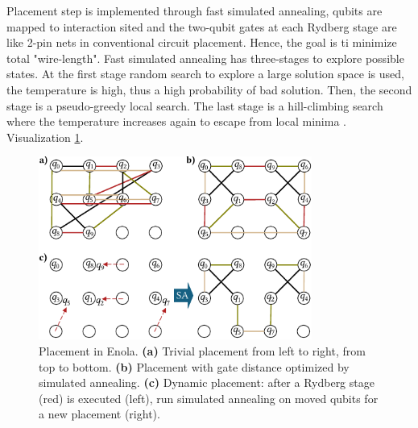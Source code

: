 Placement step is implemented through fast simulated annealing, 
qubits are mapped to interaction sited and the two-qubit
gates at each Rydberg stage are like 2-pin nets in conventional
circuit placement. Hence, the goal is ti minimize total "wire-length".
Fast simulated annealing has three-stages to explore possible states.
At the first stage random search to explore a large solution space is used, the temperature is high, 
thus a high probability of bad solution.
Then, the second stage is a pseudo-greedy local search. 
The last stage is a hill-climbing search where
the temperature increases again to escape from local minima \parencite{Tan_2025_Enola}. 
Visualization \ref{fig:placement_Enola}.
\begin{figure}[htbp]
  \centering
    \includegraphics[width=0.8\textwidth]{figures/placement_Enola.pdf}
    \caption[Placement in Enola]{ Placement in Enola. 
    \textbf{(a)} Trivial placement from left to right, from top to bottom. 
    \textbf{(b)} Placement with gate distance optimized by simulated annealing. 
    \textbf{(c)} Dynamic placement: after a Rydberg stage (red) is executed (left), run simulated
    annealing on moved qubits for a new placement (right). \parencite{Tan_2025_Enola}}
    \label{fig:placement_Enola}
\end{figure}

